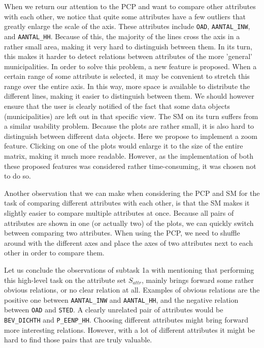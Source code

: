 When we return our attention to the PCP and want to compare other attributes with each other, we notice that quite some attributes have a few outliers that greatly enlarge the scale of the axis. These attributes include \texttt{OAD}, \texttt{AANTAL\_INW}, and \texttt{AANTAL\_HH}. Because of this, the majority of the lines cross the axis in a rather small area, making it very hard to distinguish between them. In its turn, this makes it harder to detect relations between attributes of the more 'general' municipalities. In order to solve this problem, a new feature is proposed. When a certain range of some attribute is selected, it may be convenient to stretch this range over the entire axis. In this way, more space is available to distribute the different lines, making it easier to distinguish between them. We should however ensure that the user is clearly notified of the fact that some data objects (municipalities) are left out in that specific view. The SM on its turn suffers from a similar usability problem. Because the plots are rather small, it is also hard to distinguish between different data objects. Here we propose to implement a zoom feature. Clicking on one of the plots would enlarge it to the size of the entire matrix, making it much more readable. However, as the implementation of both these proposed features was considered rather time-consuming, it was chosen not to do so.

Another observation that we can make when considering the PCP and SM for the task of comparing different attributes with each other, is that the SM makes it slightly easier to compare multiple attributes at once. Because all pairs of attributes are shown in one (or actually two) of the plots, we can quickly switch between comparing two attributes. When using the PCP, we need to shuffle around with the different axes and place the axes of two attributes next to each other in order to compare them.

Let us conclude the observations of subtask 1a with mentioning that performing this high-level task on the attribute set $S_{attr}$, mainly brings forward some rather obvious relations, or no clear relation at all. Examples of obvious relations are the positive one between \texttt{AANTAL\_INW} and \texttt{AANTAL\_HH}, and the negative relation between \texttt{OAD} and \texttt{STED}. A clearly unrelated pair of attributes would be \texttt{BEV\_DICHTH} and \texttt{P\_EENP\_HH}. Choosing different attributes might bring forward more interesting relations. However, with a lot of different attributes it might be hard to find those pairs that are truly valuable.



